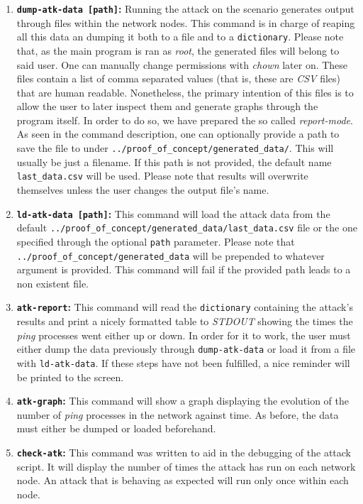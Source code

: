 \begin{enumerate}
                    \item \textbf{\texttt{dump-atk-data [path]}:} Running the attack on the scenario generates output through files within the network nodes. This command is in charge of reaping all this data an dumping it both to a file and to a \texttt{dictionary}. Please note that, as the main program is ran as \textit{root}, the generated files will belong to said user. One can manually change permissions with \textit{chown} later on. These files contain a list of comma separated values (that is, these are \textit{CSV} files) that are human readable. Nonetheless, the primary intention of this files is to allow the user to later inspect them and generate graphs through the program itself. In order to do so, we have prepared the so called \textit{report-mode}. As seen in the command description, one can optionally provide a path to save the file to under \texttt{\allowbreak ../proof\_of\_concept/generated\_data/}. This will usually be just a filename. If this path is not provided, the default name \texttt{last\_data.csv} will be used. Please note that results will overwrite themselves unless the user changes the output file's name.
                    \item \textbf{\texttt{ld-atk-data [path]}:} This command will load the attack data from the default \texttt{\allowbreak../proof\_of\_concept/generated\_data/last\_data.csv} file or the one specified through the optional \texttt{path} parameter. Please note that \texttt{\allowbreak ../proof\_of\_concept/generated\_data} will be prepended to whatever argument is provided. This command will fail if the provided path leads to a non existent file.
                    \item \textbf{\texttt{atk-report}:} This command will read the \texttt{dictionary} containing the attack's results and print a nicely formatted table to \textit{STDOUT} showing the times the \textit{ping} processes went either up or down. In order for it to work, the user must either dump the data previously through \texttt{dump-atk-data} or load it from a file with \texttt{ld-atk-data}. If these steps have not been fulfilled, a nice reminder will be printed to the screen.
                    \item \textbf{\texttt{atk-graph}:} This command will show a graph displaying the evolution of the number of \textit{ping} processes in the network against time. As before, the data must either be dumped or loaded beforehand.
                    \item \textbf{\texttt{check-atk}:} This command was written to aid in the debugging of the attack script. It will display the number of times the attack has run on each network node. An attack that is behaving as expected will run only once within each node.

\end{enumerate}

